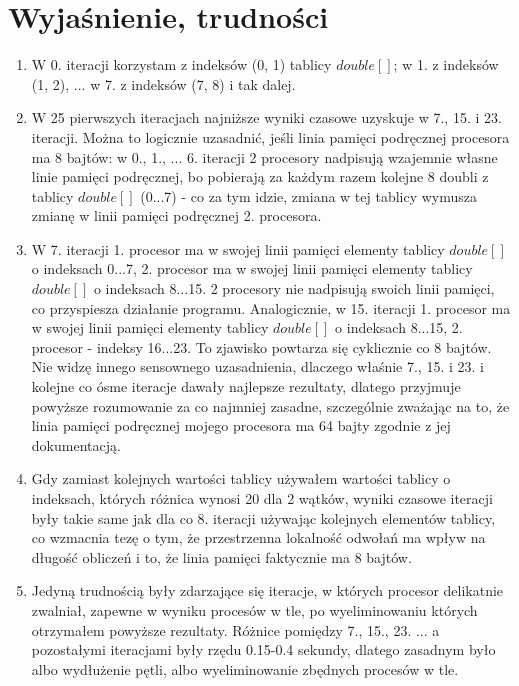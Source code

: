 \documentclass[12pt]{article}
\begin{document}
\section{Wyjaśnienie, trudności}
\begin{enumerate}
	\item W 0. iteracji korzystam z indeksów (0, 1) tablicy $double[]$; w 1. z indeksów (1, 2), ... w 7. z indeksów (7, 8) i tak dalej.
	\item W 25 pierwszych iteracjach najniższe wyniki czasowe uzyskuje w 7., 15. i 23. iteracji. Można to logicznie uzasadnić, jeśli linia pamięci podręcznej procesora ma 8 bajtów: w 0., 1., ... 6. iteracji 2 procesory nadpisują wzajemnie własne linie pamięci podręcznej, bo pobierają za każdym razem kolejne 8 doubli z tablicy $double[]$ (0...7) - co za tym idzie, zmiana w tej tablicy wymusza zmianę w linii pamięci podręcznej 2. procesora. 
	\item W 7. iteracji 1. procesor ma w swojej linii pamięci elementy tablicy $double[]$ o indeksach 0...7, 2. procesor ma w swojej linii pamięci elementy tablicy $double[]$ o indeksach 8...15. 2 procesory nie nadpisują swoich linii pamięci, co przyspiesza działanie programu. Analogicznie, w 15. iteracji 1. procesor ma w swojej linii pamięci elementy tablicy $double[]$ o indeksach 8...15, 2. procesor - indeksy 16...23. To zjawisko powtarza się cyklicznie co 8 bajtów. Nie widzę innego sensownego uzasadnienia, dlaczego właśnie 7., 15. i 23. i kolejne co ósme iteracje dawały najlepsze rezultaty, dlatego przyjmuje powyższe rozumowanie za co najmniej zasadne, szczególnie zważając na to, że linia pamięci podręcznej mojego procesora ma 64 bajty zgodnie z jej dokumentacją.
	\item Gdy zamiast kolejnych wartości tablicy używałem wartości tablicy o indeksach, których różnica wynosi 20 dla 2 wątków, wyniki czasowe iteracji były takie same jak dla co 8. iteracji używając kolejnych elementów tablicy, co wzmacnia tezę o tym, że przestrzenna lokalność odwołań ma wpływ na długość obliczeń i to, że linia pamięci faktycznie ma 8 bajtów.
	\item Jedyną trudnością były zdarzające się iteracje, w których procesor delikatnie zwalniał, zapewne w wyniku procesów w tle, po wyeliminowaniu których otrzymałem powyższe rezultaty. Różnice pomiędzy 7., 15., 23. ... a pozostałymi iteracjami były rzędu 0.15-0.4 sekundy, dlatego zasadnym było albo wydłużenie pętli, albo wyeliminowanie zbędnych procesów w tle.
\end{enumerate}
\end{document}
